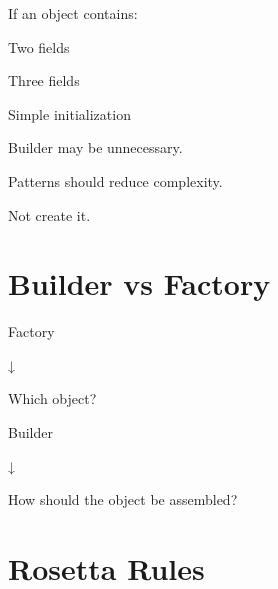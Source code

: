\documentclass[11pt,a4paper]{book}
\begin{document}
\begin{trap}

If an object contains:


Two fields


Three fields


Simple initialization


Builder may be unnecessary.


Patterns should reduce
complexity.


Not create it.

\end{trap}

\section{Builder vs Factory}

\begin{mentalmodel}

Factory

↓

Which object?

\vspace{0.5em}

Builder

↓

How should the object
be assembled?

\end{mentalmodel}


\section{Rosetta Rules}
\end{document}
